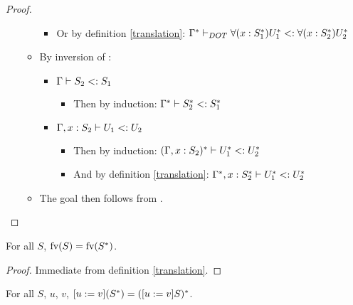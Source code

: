 \begin{proof}
\begin{itemize}
\begin{itemize}
\begin{itemize}
                \item Or by definition \ref{translation}:
                    $\Gamma^{*} \vdash_{DOT} \forall(x:S_1^{*})U_1^{*} <: \forall(x:S_2^{*})U_2^{*}$
            \end{itemize}
            \item By inversion of :
            \begin{itemize}
                \item $\Gamma \vdash S_2 <: S_1$
                \begin{itemize}
                    \item Then by induction:
                        $\Gamma^{*} \vdash S_2^{*} <: S_1^{*}$
                \end{itemize}
                \item $\Gamma, x: S_2 \vdash U_1 <: U_2$
                \begin{itemize}
                    \item Then by induction: $(\Gamma, x: S_2)^{*} \vdash U_1^{*} <: U_2^{*}$
                    \item And by definition \ref{translation}:
                        $\Gamma^{*}, x:
                        S_2^{*} \vdash U_1^{*} <: U_2^{*}$
                \end{itemize}
            \end{itemize}
            \item The goal then follows from .
        \end{itemize}
    \end{itemize}
\end{proof}

\begin{LEMMA}
    \label{pres_fv}
    For all $S$, $\text{fv}(S) = \text{fv}(S^{*})$.
\end{LEMMA}

\begin{proof}
    Immediate from definition \ref{translation}.
\end{proof}

\begin{LEMMA}
    \label{comm_trans_sub}
    For all $S$, $u$, $v$, $[u := v](S^{*}) = ([u := v]S)^{*}$.
\end{LEMMA}

